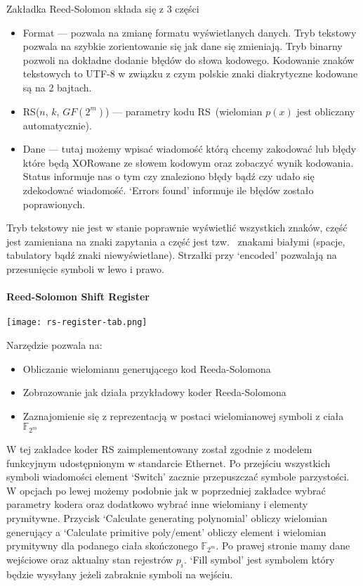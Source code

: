 Zakładka Reed-Solomon składa się z 3 części
\begin{itemize}
    \item Format --- pozwala na zmianę formatu wyświetlanych danych.
    Tryb tekstowy pozwala na szybkie zorientowanie się jak dane się
    zmieniają. Tryb binarny pozwoli na dokładne dodanie błędów do
    słowa kodowego. Kodowanie znaków tekstowych to UTF-8 w związku z
    czym polskie znaki diakrytyczne kodowane są na 2 bajtach.
    \item RS($n$, $k$, $GF(2^m)$) --- parametry kodu
    RS~(wielomian $p(x)$ jest obliczany automatycznie).
    \item Dane --- tutaj możemy wpisać wiadomość którą chcemy
    zakodować lub błędy które będą XORowane ze słowem kodowym oraz
    zobaczyć wynik kodowania. Status informuje nas o tym czy
    znaleziono błędy bądź czy udało się zdekodować wiadomość.
    `Errors found' informuje ile błędów zostało poprawionych.
\end{itemize}

Tryb tekstowy nie jest w stanie poprawnie wyświetlić wszystkich
znaków, część jest zamieniana na znaki zapytania a część jest tzw.
~znakami białymi (spacje, tabulatory bądź znaki niewyświetlane).
Strzałki przy `encoded' pozwalają na przesunięcie symboli w lewo i prawo.

\paragraph{Reed-Solomon Shift Register}
\begin{center}
    \texttt{[image: rs-register-tab.png]}
\end{center}
Narzędzie pozwala na:
\begin{itemize}
    \item Obliczanie wielomianu generującego kod Reeda-Solomona
    \item Zobrazowanie jak działa przykładowy koder Reeda-Solomona
    \item Zaznajomienie się z reprezentacją w postaci wielomianowej symboli z ciała $\mathbb{F}_{2^m}$
\end{itemize}

W tej zakładce koder RS zaimplementowany został zgodnie z modelem
funkcyjnym udostępnionym w standarcie Ethernet. Po przejściu
wszystkich symboli wiadomości element `Switch' zacznie przepuszczać symbole parzystości.
W opcjach po lewej możemy podobnie jak w poprzedniej zakładce wybrać
parametry kodera oraz dodatkowo wybrać inne wielomiany i elementy prymitywne. Przycisk `Calculate generating polynomial' obliczy
wielomian generujący a `Calculate primitive poly/ement' obliczy element i wielomian prymitywny dla podanego ciała skończonego $\mathbb{F}_{2^m}$.
Po prawej stronie mamy dane wejściowe oraz aktualny stan rejestrów $p_i$. `Fill symbol' jest symbolem który będzie wysyłany jeżeli zabraknie symboli na wejściu.

